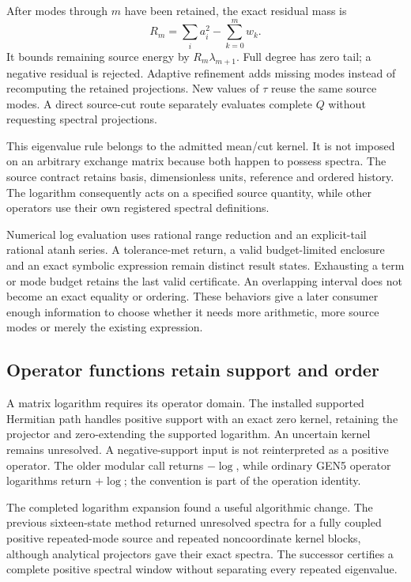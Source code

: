 After modes through $m$ have been retained, the exact residual mass is
\[
 R_m=\sum_i a_i^2-\sum_{k=0}^m w_k.
\]
It bounds remaining source energy by $R_m\lambda_{m+1}$. Full degree has zero tail; a negative residual is rejected. Adaptive refinement adds missing modes instead of recomputing the retained projections. New values of $\tau$ reuse the same source modes. A direct source-cut route separately evaluates complete $Q$ without requesting spectral projections.

This eigenvalue rule belongs to the admitted mean/cut kernel. It is not imposed on an arbitrary exchange matrix because both happen to possess spectra. The source contract retains basis, dimensionless units, reference and ordered history. The logarithm consequently acts on a specified source quantity, while other operators use their own registered spectral definitions.

Numerical log evaluation uses rational range reduction and an explicit-tail rational atanh series. A tolerance-met return, a valid budget-limited enclosure and an exact symbolic expression remain distinct result states. Exhausting a term or mode budget retains the last valid certificate. An overlapping interval does not become an exact equality or ordering. These behaviors give a later consumer enough information to choose whether it needs more arithmetic, more source modes or merely the existing expression.

\subsection{Operator functions retain support and order}
\label{v3-runtime-operator-log}

A matrix logarithm requires its operator domain. The installed supported Hermitian path handles positive support with an exact zero kernel, retaining the projector and zero-extending the supported logarithm. An uncertain kernel remains unresolved. A negative-support input is not reinterpreted as a positive operator. The older modular call returns $-\log$, while ordinary GEN5 operator logarithms return $+\log$; the convention is part of the operation identity.

The completed logarithm expansion found a useful algorithmic change. The previous sixteen-state method returned unresolved spectra for a fully coupled positive repeated-mode source and repeated noncoordinate kernel blocks, although analytical projectors gave their exact spectra. The successor certifies a complete positive spectral window without separating every repeated eigenvalue.

